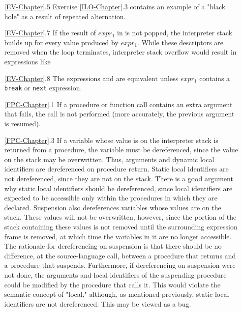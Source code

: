 \begin{itemize}
\goodbreak\item[\ref*{EV-Chapter}.5]
Exercise \ref*{ILO-Chapter}.3 contains an example of a "black hole" as a result of
repeated alternation.

\goodbreak\item[\ref*{EV-Chapter}.7]
If the result of $expr_1$ in
is not popped, the interpreter stack builds up for every value produced by
$expr_1$. While these descriptors are removed when the loop terminates,
interpreter stack overflow would result in expressions like

\goodbreak\item[\ref*{EV-Chapter}.8]
The expressions
and
are equivalent unless $expr_1$ contains a \texttt{break} or \texttt{next} expression.

\goodbreak\item[\ref*{FPC-Chapter}.1]
If a procedure or function call contains an extra argument that fails, the
call is not performed (more accurately, the previous argument is resumed).

\goodbreak\item[\ref*{FPC-Chapter}.3]
If a variable whose value is on the interpreter stack is returned from a procedure,
the variable must be dereferenced, since the value on the stack
may be overwritten. Thus, arguments and dynamic local identifiers are
dereferenced on procedure return. Static local identifiers are not dereferenced,
since they are not on the stack. There is a good argument why
static local identifiers should be dereferenced, since local identifiers are
expected to be accessible only within the procedures in which they are
declared. Suspension also dereferences variables whose values are on the
stack. These values will not be overwritten, however, since the portion of
the stack containing these values is not removed until the surrounding
expression frame is removed, at which time the variables in it are no
longer accessible. The rationale for dereferencing on suspension is that
there should be no difference, at the source-language call, between a procedure
that returns and a procedure that suspends. Furthermore, if dereferencing
on suspension were not done, the arguments and local
identifiers of the suspending procedure could be modified by the procedure
that calls it. This would violate the semantic concept of "local,"
although, as mentioned previously, static local identifiers are not dereferenced.
This may be viewed as a bug.


\end{itemize}
